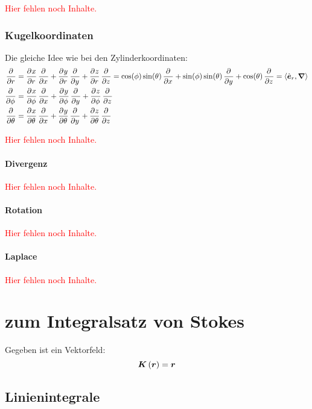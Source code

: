 \documentclass[11pt, ngerman]{article}
\newcommand{\fehlt}{\textcolor{red}{Hier fehlen noch Inhalte.}}
\newcommand{\inner}[2]{\left\langle #1, #2 \right\rangle}
\newcommand{\vnabla}{\vec \nabla}
\renewcommand{\vec}[1]{\boldsymbol{#1}}
\begin{document}
\fehlt

\subsubsection{Kugelkoordinaten}

Die gleiche Idee wie bei den Zylinderkoordinaten:
\begin{align*}
	\dpd{}r &= \dpd xr \dpd{}x + \dpd yr \dpd{}y + \dpd zr \dpd{}z = \cos(\phi) \sin(\theta) \dpd{}x + \sin(\phi) \sin(\theta) \dpd{}y + \cos(\theta) \dpd{}z = \inner{\hat{\vec e}_r}\vnabla \\
	\dpd{}\phi &= \dpd x\phi \dpd{}x + \dpd y\phi \dpd{}y + \dpd z\phi \dpd{}z \\
	\dpd{}\theta &= \dpd x\theta \dpd{}x + \dpd y\theta \dpd{}y + \dpd z\theta \dpd{}z
\end{align*}

\fehlt

\paragraph{Divergenz}

\fehlt

\paragraph{Rotation}

\fehlt

\paragraph{Laplace}

\fehlt


\section{zum Integralsatz von Stokes}

Gegeben ist ein Vektorfeld:
\[ \vec K \del{\vec r} = \vec r \]

\subsection{Linienintegrale}
\end{document}
